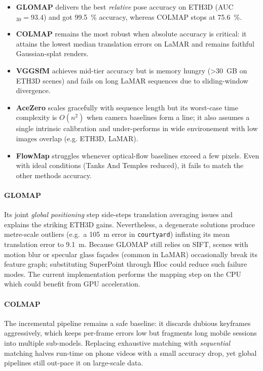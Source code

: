 \begin{itemize}
    \item \textbf{GLOMAP} delivers the best \emph{relative} pose accuracy on ETH3D (AUC$_{30}=93.4$) and got \SI{99.5}{\percent} accuracy, whereas COLMAP stops at \SI{75.6}{\percent}.
    \item \textbf{COLMAP} remains the most robust when absolute accuracy is critical: it attains the lowest median translation errors on LaMAR and remains faithful Gaussian-splat renders.
    \item \textbf{VGGSfM} achieves mid-tier accuracy but is memory hungry (\SI{>30}{GB} on ETH3D scenes) and fails on long LaMAR sequences due to sliding-window divergence.
    \item \textbf{AceZero} scales gracefully with sequence length but its worst-case time complexity is $O(n^{2})$ when camera baselines form a line; it also assumes a single intrinsic calibration and under-performs in wide environement with low images overlap (e.g. ETH3D, LaMAR).
    \item \textbf{FlowMap} struggles whenever optical-flow baselines exceed a few pixels. Even with ideal conditions (Tanks And Temples reduced), it fails to match the other methods accuracy.
\end{itemize}

\paragraph{GLOMAP}
Its joint \emph{global positioning} step side-steps translation averaging issues and explains the striking ETH3D gains.  
Nevertheless, a degenerate solutions produce metre-scale outliers (e.g.\ a \SI{105}{m} error in \texttt{courtyard}) inflating its mean translation error to \SI{9.1}{m}.
Because GLOMAP still relies on SIFT, scenes with motion blur or specular glass façades (common in LaMAR) occasionally break its feature graph; substituting SuperPoint \cite{detone18superpoint} through Hloc \cite{sarlin2019coarse} could reduce such failure modes.
The current implementation performs the mapping step on the CPU which could benefit from GPU acceleration.

\paragraph{COLMAP}
The incremental pipeline remains a safe baseline: it discards dubious keyframes aggressively, which keeps per-frame errors low but fragments long mobile sessions into multiple sub-models.
Replacing exhaustive matching with \emph{sequential} matching halves run-time on phone videos with a small accuracy drop, yet global pipelines still out-pace it on large-scale data.

